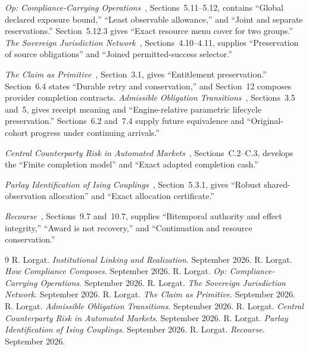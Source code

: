 \documentclass{momentum}
\begin{document}
\emph{Op: Compliance-Carrying Operations}~\cite{op}, Sections~5.11--5.12, contains ``Global declared exposure bound,'' ``Least observable allowance,'' and ``Joint and separate reservations.''
Section~5.12.3 gives ``Exact resource menu cover for two groups.''
\emph{The Sovereign Jurisdiction Network}~\cite{recognition}, Sections~4.10--4.11, supplies ``Preservation of source obligations'' and ``Joined permitted-success selector.''

\emph{The Claim as Primitive}~\cite{claim}, Section~3.1, gives ``Entitlement preservation.''
Section~6.4 states ``Durable retry and conservation,'' and Section~12 composes provider completion contracts.
\emph{Admissible Obligation Transitions}~\cite{transitions}, Sections~3.5 and~5, gives receipt meaning and ``Engine-relative parametric lifecycle preservation.''
Sections~6.2 and~7.4 supply future equivalence and ``Original-cohort progress under continuing arrivals.''

\emph{Central Counterparty Risk in Automated Markets}~\cite{risk}, Sections~C.2--C.3, develops the ``Finite completion model'' and ``Exact adapted completion cash.''

\emph{Parlay Identification of Ising Couplings}~\cite{parlay}, Section~5.3.1, gives ``Robust shared-observation allocation'' and ``Exact allocation certificate.''

\emph{Recourse}~\cite{recourse}, Sections~9.7 and~10.7, supplies ``Bitemporal authority and effect integrity,'' ``Award is not recovery,'' and ``Continuation and resource conservation.''

\begin{thebibliography}{9}
 R. Lorgat. \emph{Institutional Linking and Realization}. September 2026.
 R. Lorgat. \emph{How Compliance Composes}. September 2026.
 R. Lorgat. \emph{Op: Compliance-Carrying Operations}. September 2026.
 R. Lorgat. \emph{The Sovereign Jurisdiction Network}. September 2026.
 R. Lorgat. \emph{The Claim as Primitive}. September 2026.
 R. Lorgat. \emph{Admissible Obligation Transitions}. September 2026.
 R. Lorgat. \emph{Central Counterparty Risk in Automated Markets}. September 2026.
 R. Lorgat. \emph{Parlay Identification of Ising Couplings}. September 2026.
 R. Lorgat. \emph{Recourse}. September 2026.
\end{thebibliography}
\end{document}
